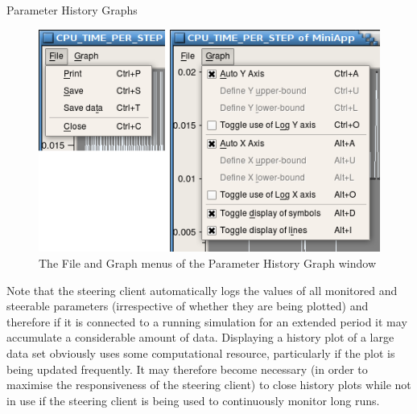 \documentclass[a4paper,twoside]{article}
\begin{document}
\begin{section}{Parameter History Graphs}
\begin{figure}
\centerline{\includegraphics{hist_plot_menus.png}}
\caption{The File and Graph menus of the Parameter History Graph window}
\label{fig:param_hist_menus}
\end{figure}

Note that the steering client automatically logs the values of all
monitored and steerable parameters (irrespective of whether they are
being plotted) and therefore if it is connected to a running
simulation for an extended period it may accumulate a considerable
amount of data.  Displaying a history plot of a large data set
obviously uses some computational resource, particularly if the plot
is being updated frequently.  It may therefore become necessary (in order to
maximise the responsiveness of the steering client) to close history plots
while not in use if the steering client is being used to
continuously monitor long runs.

\end{section} %

\end{document}
